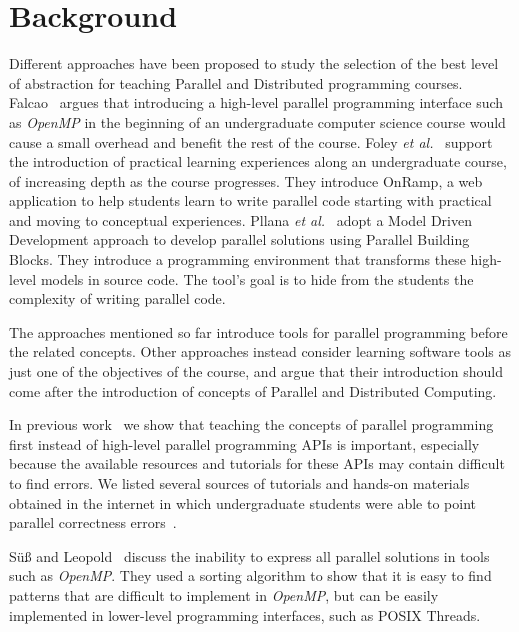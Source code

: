 \section{Background}
\label{sec:background}

Different approaches have been proposed to study the selection of the best level of
abstraction for teaching Parallel and Distributed programming courses.
Falcao~\cite{6565518} argues that introducing a high-level parallel programming
interface such as \textit{OpenMP} in the beginning of an undergraduate computer
science course would cause a small overhead and benefit the rest of the course.
Foley \textit{et al.}~\cite{FOLEY2017138} support the introduction of practical
learning experiences along an undergraduate course, of increasing depth as the
course progresses. They introduce OnRamp, a web application to help students
learn to write parallel code starting with practical and moving to conceptual
experiences.  Pllana \textit{et al.}~\cite{Pllana:2009} adopt a Model Driven
Development approach to develop parallel solutions using Parallel Building
Blocks. They introduce a programming environment that transforms these
high-level models in source code. The tool's goal is to hide from the students
the complexity of writing parallel code.

The approaches mentioned so far introduce tools for parallel programming before
the related concepts.  Other approaches instead consider learning software
tools as just one of the objectives of the course, and argue that their
introduction should come after the introduction of concepts of Parallel and
Distributed Computing.

In previous work~\cite{goncalves:OpenMPNotEasy} we show that teaching the
concepts of parallel programming first instead of high-level parallel
programming APIs is important, especially because the available resources and
tutorials for these APIs may contain difficult to find errors.  We listed
several sources of tutorials and hands-on materials obtained in the internet in
which undergraduate students were able to point parallel correctness
errors~\cite{SuB:2005:CMO:1892830.1892863}.

Sü\ss{} and Leopold~\cite{Leopold:userOpenMP} discuss the inability to express
all parallel solutions in tools such as \textit{OpenMP}. They used a sorting
algorithm to show that it is easy to find patterns that are difficult to
implement in \textit{OpenMP}, but can be easily implemented in lower-level
programming interfaces, such as POSIX Threads.

